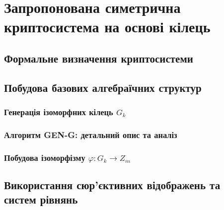 \documentclass[a4paper,12pt]{article}
\begin{document}
    \newpage

    \section{Запропонована симетрична криптосистема на основі кілець} %

    \subsection{Формальне визначення криптосистеми} %

    \subsection{Побудова базових алгебраїчних структур} %

    \subsubsection{Генерація ізоморфних кілець \(G_k\)} %

    \subsubsection{Алгоритм GEN-G: детальний опис та аналіз} %

    \subsubsection{Побудова ізоморфізму \(\varphi: G_k \to Z_m\)} %

    \subsection{Використання сюр'єктивних відображень та систем рівнянь} %
\end{document}
